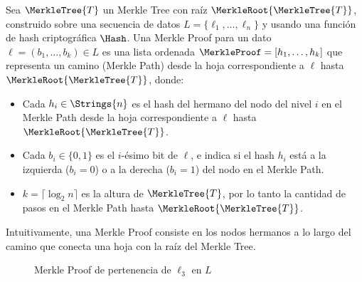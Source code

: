 \begin{definition}
	Sea $\MerkleTree{T}$ un Merkle Tree con raíz $\MerkleRoot{\MerkleTree{T}}$, construido sobre una secuencia de datos $L = \{\ell_1, \ldots, \ell_n\}$ y usando una función de hash criptográfica $\Hash$. Una Merkle Proof para un dato $\ell = (b_1, \ldots, b_k) \in L$ es una lista ordenada $\MerkleProof = [h_1, \ldots, h_k]$ que representa un camino (Merkle Path) desde la hoja correspondiente a $\ell$ hasta $\MerkleRoot{\MerkleTree{T}}$, donde:
	\begin{itemize}
		\item Cada $h_i \in \Strings{n}$ es el hash del hermano del nodo del nivel $i$ en el Merkle Path desde la hoja correspondiente a $\ell$ hasta $\MerkleRoot{\MerkleTree{T}}$.
		\item Cada $b_i \in \{0,1\}$ es el $i$-ésimo bit de $\ell$, e indica si el hash $h_i$ está a la izquierda ($b_i = 0$) o a la derecha ($b_i = 1$) del nodo en el Merkle Path.
		\item $k = \lceil \log_2 n \rceil$ es la altura de $\MerkleTree{T}$, por lo tanto la cantidad de pasos en el Merkle Path hasta $\MerkleRoot{\MerkleTree{T}}$.
	\end{itemize}
\end{definition}

Intuitivamente, una Merkle Proof consiste en los nodos hermanos a lo largo del camino que conecta una hoja con la raíz del Merkle Tree.

\begin{figure}[h]
	\centering
	\caption{Merkle Proof de pertenencia de $\ell_3$ en $L$}
	\label{fig:verify-merkle-proof}
\end{figure}

